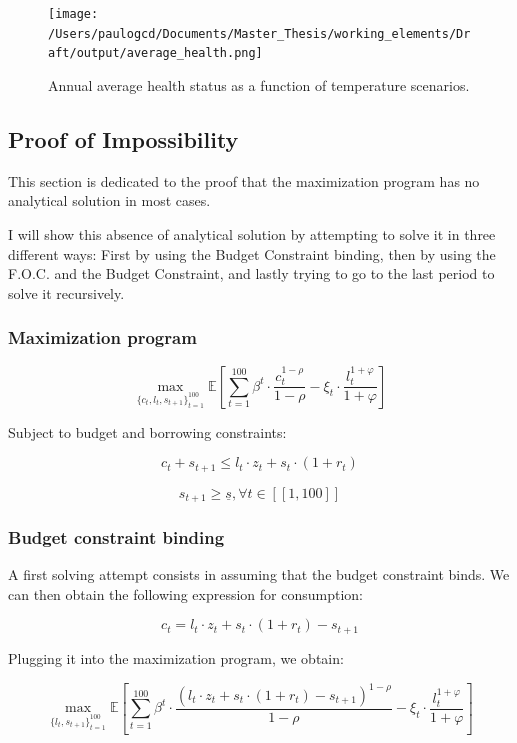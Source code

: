 \documentclass{article}
\begin{document}
\begin{figure}[H]
    \texttt{[image: /Users/paulogcd/Documents/Master\_Thesis/working\_elements/Draft/output/average\_health.png]}
    \caption{Annual average health status as a function of temperature scenarios.}
\end{figure}

\subsection{Proof of Impossibility}

This section is dedicated to the proof that the maximization program
has no analytical solution in most cases.

I will show this absence of analytical solution by attempting to solve it in three different 
ways: First by using the Budget Constraint binding, then by using the F.O.C. and the Budget Constraint,
and lastly trying to go to the last period to solve it recursively. 

\subsubsection{Maximization program}

$$ \max_{\{c_{t},l_{t},s_{t+1}\}_{t=1}^{100}}
{\mathbb{E}\left[\sum_{t=1}^{100} \beta^{t}\cdot \frac{c_{t}^{1-\rho}}{1-\rho}-\xi_{t}\cdot \frac{l_{t}^{1+\varphi}}{1+\varphi}\right]}$$

Subject to budget and borrowing constraints:

$$c_{t} + s_{t+1} \leq l_{t}\cdot z_{t} + s_{t}\cdot(1+r_{t})$$

$$s_{t+1}\geq \underline{s}, \forall t \in [\![1,100]\!]$$

\subsubsection{Budget constraint binding}

A first solving attempt consists in assuming that the budget constraint binds.
We can then obtain the following expression for consumption: 

$$c_{t} = l_{t}\cdot z_{t} + s_{t}\cdot(1+r_{t}) - s_{t+1}$$

Plugging it into the maximization program, we obtain:

$$ \max_{\{l_{t},s_{t+1}\}_{t=1}^{100}}
{\mathbb{E}\left[\sum_{t=1}^{100} \beta^{t}\cdot \frac{\left(l_{t}\cdot z_{t} + s_{t}\cdot(1+r_{t}) - s_{t+1}\right)^{1-\rho}}{1-\rho}-\xi_{t}\cdot \frac{l_{t}^{1+\varphi}}{1+\varphi}\right]}$$
\end{document}
